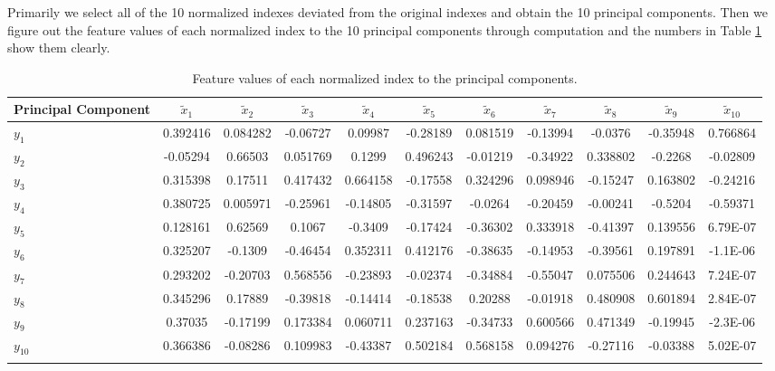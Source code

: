 \documentclass{apmcmthesis}
\begin{document}
Primarily we select all of the 10 normalized indexes deviated from the original indexes and obtain the 10 principal components. Then we figure out the feature values of each normalized index to the 10 principal components through computation and the numbers in Table \ref{table feature value to principal component} show them clearly.
\begin{table}[h]
\centering
\tiny
\caption{Feature values of each normalized index to the principal components.}
\begin{tabular}{p{1.5cm}<{\centering}cccccccccc}
\toprule
\textbf{Principal Component}& \textbf{${\tilde{x}}_{1}$}&\textbf{${\tilde{x}}_{2}$}&\textbf{${\tilde{x}}_{3}$}&\textbf{${\tilde{x}}_{4}$}&\textbf{${\tilde{x}}_{5}$}&\textbf{${\tilde{x}}_{6}$} &\textbf{${\tilde{x}}_{7}$}&\textbf{${\tilde{x}}_{8}$}&\textbf{${\tilde{x}}_{9}$}&\textbf{${\tilde{x}}_{10}$}\\
\midrule
\textbf{$y_1$}&0.392416 & 0.084282 & -0.06727 & 0.09987 & -0.28189 & 0.081519 & -0.13994 & -0.0376 & -0.35948 & 0.766864 \\
\textbf{$y_2$}&-0.05294 & 0.66503 & 0.051769 & 0.1299 & 0.496243 & -0.01219 & -0.34922 & 0.338802 & -0.2268 & -0.02809 \\
\textbf{$y_3$}&0.315398 & 0.17511 & 0.417432 & 0.664158 & -0.17558 & 0.324296 & 0.098946 & -0.15247 & 0.163802 & -0.24216 \\
\textbf{$y_4$}&0.380725 & 0.005971 & -0.25961 & -0.14805 & -0.31597 & -0.0264 & -0.20459 & -0.00241 & -0.5204 & -0.59371 \\
\textbf{$y_5$}&0.128161 & 0.62569 & 0.1067 & -0.3409 & -0.17424 & -0.36302 & 0.333918 & -0.41397 & 0.139556 & 6.79E-07 \\
\textbf{$y_6$}&0.325207 & -0.1309 & -0.46454 & 0.352311 & 0.412176 & -0.38635 & -0.14953 & -0.39561 & 0.197891 & -1.1E-06 \\
\textbf{$y_7$}&0.293202 & -0.20703 & 0.568556 & -0.23893 & -0.02374 & -0.34884 & -0.55047 & 0.075506 & 0.244643 & 7.24E-07 \\
\textbf{$y_8$}&0.345296 & 0.17889 & -0.39818 & -0.14414 & -0.18538 & 0.20288 & -0.01918 & 0.480908 & 0.601894 & 2.84E-07 \\
\textbf{$y_9$}&0.37035 & -0.17199 & 0.173384 & 0.060711 & 0.237163 & -0.34733 & 0.600566 & 0.471349 & -0.19945 & -2.3E-06 \\
\textbf{$y_{10}$}&0.366386 & -0.08286 & 0.109983 & -0.43387 & 0.502184 & 0.568158 & 0.094276 & -0.27116 & -0.03388 & 5.02E-07 \\
\bottomrule\label{table feature value to principal component}
\end{tabular}
\end{table}
\end{document}
